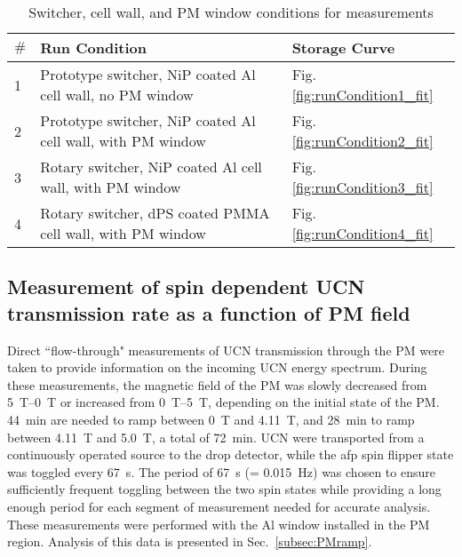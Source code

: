 \begin{table}
\centering
\caption[North beamline characterization run conditions]{\label{tb:runconditions}Switcher, cell wall, and PM window conditions for measurements} 
\begin{tabular}{lll}
\toprule
\multicolumn{1}{l}{$\#$} & \multicolumn{1}{l}{Run Condition}  & \multicolumn{1}{l}{Storage Curve} \\
\midrule
 1 & Prototype switcher, NiP coated Al cell wall, no  PM window & Fig. \ref{fig:runCondition1_fit} \\  
 2 & Prototype switcher, NiP coated Al cell wall, with PM window & Fig. \ref{fig:runCondition2_fit} \\
 3 & Rotary switcher, NiP coated Al cell wall, with PM window & Fig. \ref{fig:runCondition3_fit} \\
 4 & Rotary switcher, dPS coated PMMA cell wall, with PM window & Fig. \ref{fig:runCondition4_fit} \\
\bottomrule
\end{tabular}
\end{table}


\subsection{\label{subsec:PMrampMeasurement}Measurement of spin dependent UCN transmission rate as a function of PM field}


Direct ``flow-through" measurements of UCN transmission through the PM were taken to provide information on the incoming UCN energy spectrum. During these measurements, the magnetic field of the PM was slowly decreased from \qtyrange{5}{0}{\tesla} or increased from \qtyrange{0}{5}{\tesla}, depending on the initial state of the PM. \qty{44}{\minute} are needed to ramp between 0~T and 4.11~T, and \qty{28}{\minute} to ramp between 4.11~T and 5.0~T, a total of \qty{72}{\minute}. UCN were transported from a continuously operated source to the drop detector, while the \acrshort{afp} spin flipper state was toggled every \qty{67}{\s}. The period of 67~s (= 0.015~Hz) was chosen to ensure sufficiently frequent toggling between the two spin states while providing a long enough period for each segment of measurement needed for accurate analysis. These measurements were performed with the Al window installed in the PM region. Analysis of this data is presented in Sec.~\ref{subsec:PMramp}.

